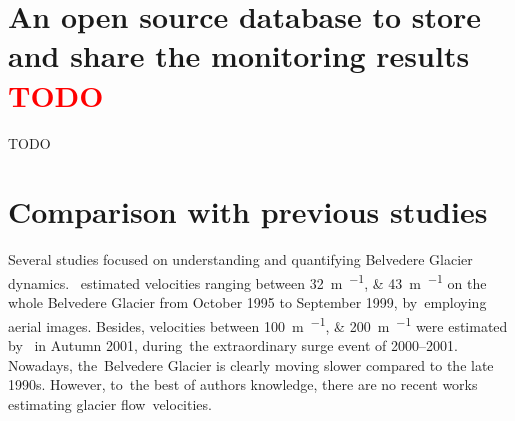 

\section{An open source database to store and share the monitoring results \textcolor{red}{TODO}}

{\color{red} TODO}





\section{Comparison with previous studies}\label{sec:3:prevstudies}

Several studies focused on understanding and quantifying Belvedere Glacier
dynamics.~\cite{Kaab2005} estimated velocities ranging between
\SIlist{32;43}{\meter\per\year} on the whole Belvedere Glacier from October 1995 to
September 1999, by~employing aerial images.
Besides, velocities between \SIlist{100;200}{\meter\per\year} were estimated
by~\cite{Kaab2005} in Autumn 2001, during~the extraordinary surge event of 2000--2001.
Nowadays, the~Belvedere Glacier is clearly moving slower compared to the late 1990s.
However, to~the best of authors knowledge, there are no recent works estimating glacier
flow~velocities.

